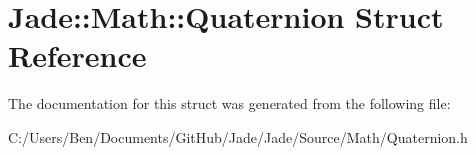 \hypertarget{struct_jade_1_1_math_1_1_quaternion}{}\section{Jade\+:\+:Math\+:\+:Quaternion Struct Reference}
\label{struct_jade_1_1_math_1_1_quaternion}


The documentation for this struct was generated from the following file\+:\begin{DoxyCompactItemize}
\item 
C\+:/\+Users/\+Ben/\+Documents/\+Git\+Hub/\+Jade/\+Jade/\+Source/\+Math/Quaternion.\+h\end{DoxyCompactItemize}

